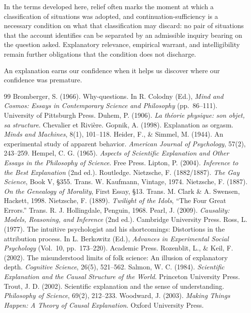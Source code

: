 \documentclass[11pt,letterpaper]{article}
\theoremstyle{definition}
\begin{document}
In the terms developed here, relief often marks the moment at which a classification of situations was adopted, and continuation-sufficiency is a necessary condition on what that classification may discard: no pair of situations that the account identifies can be separated by an admissible inquiry bearing on the question asked. Explanatory relevance, empirical warrant, and intelligibility remain further obligations that the condition does not discharge.

An explanation earns our confidence when it helps us discover where our confidence was premature.

\begin{thebibliography}{99}
 Bromberger, S. (1966). Why-questions. In R. Colodny (Ed.), \emph{Mind and Cosmos: Essays in Contemporary Science and Philosophy} (pp.~86--111). University of Pittsburgh Press.
 Duhem, P. (1906). \emph{La th\'eorie physique: son objet, sa structure}. Chevalier et Rivi\`ere.
 Gopnik, A. (1998). Explanation as orgasm. \emph{Minds and Machines}, 8(1), 101--118.
 Heider, F., \& Simmel, M. (1944). An experimental study of apparent behavior. \emph{American Journal of Psychology}, 57(2), 243--259.
 Hempel, C. G. (1965). \emph{Aspects of Scientific Explanation and Other Essays in the Philosophy of Science}. Free Press.
 Lipton, P. (2004). \emph{Inference to the Best Explanation} (2nd ed.). Routledge.
 Nietzsche, F. (1882/1887). \emph{The Gay Science}, Book V, \S355. Trans. W. Kaufmann, Vintage, 1974.
 Nietzsche, F. (1887). \emph{On the Genealogy of Morality}, First Essay, \S13. Trans. M. Clark \& A. Swensen, Hackett, 1998.
 Nietzsche, F. (1889). \emph{Twilight of the Idols}, ``The Four Great Errors.'' Trans. R. J. Hollingdale, Penguin, 1968.
 Pearl, J. (2009). \emph{Causality: Models, Reasoning, and Inference} (2nd ed.). Cambridge University Press.
 Ross, L. (1977). The intuitive psychologist and his shortcomings: Distortions in the attribution process. In L. Berkowitz (Ed.), \emph{Advances in Experimental Social Psychology} (Vol.~10, pp.~173--220). Academic Press.
 Rozenblit, L., \& Keil, F. (2002). The misunderstood limits of folk science: An illusion of explanatory depth. \emph{Cognitive Science}, 26(5), 521--562.
 Salmon, W. C. (1984). \emph{Scientific Explanation and the Causal Structure of the World}. Princeton University Press.
 Trout, J. D. (2002). Scientific explanation and the sense of understanding. \emph{Philosophy of Science}, 69(2), 212--233.
 Woodward, J. (2003). \emph{Making Things Happen: A Theory of Causal Explanation}. Oxford University Press.
\end{thebibliography}
\end{document}
